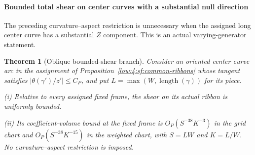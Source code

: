 \documentclass[11pt]{amsart}
\newtheorem{theorem}{Theorem}[section]
\theoremstyle{definition}
\theoremstyle{remark}
\numberwithin{equation}{section}
\begin{document}
\paragraph{Bounded total shear on center curves with a substantial null direction}
The preceding curvature--aspect restriction is unnecessary when the assigned long center curve has a substantial $Z$ component. This is an actual varying-generator statement.

\begin{theorem}[Oblique bounded-shear branch]\label{low:4:sf:thm:oblique}
Consider an oriented center curve arc in the assignment of Proposition~\ref{low:4:sf:common-ribbons} whose tangent satisfies $|\theta(\gamma')/z'|\le C_P$, and put $L=\max(W,\operatorname{length}(\gamma))$ for its piece.

\noindent\textup{(i)} Relative to every assigned fixed frame, the shear on its actual ribbon is uniformly bounded.

\noindent\textup{(ii)} Its coefficient-volume bound at the fixed frame is $O_P(S^{-38}K^{-3})$ in the grid chart and $O_P(S^{-38}K^{-15})$ in the weighted chart, with $S=LW$ and $K=L/W$. No curvature--aspect restriction is imposed.
\end{theorem}
\end{document}
